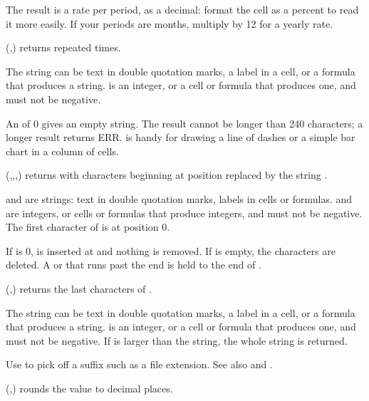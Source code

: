 The result is a rate per period, as a decimal: format the cell as a percent to read it more easily. If your periods are months, multiply by 12 for a yearly rate.

\Examples
{}

(,) returns  repeated  times.

The string can be text in double quotation marks, a label in a cell, or a formula that produces a string.  is an integer, or a cell or formula that produces one, and must not be negative.

An  of 0 gives an empty string. The result cannot be longer than 240 characters; a longer result returns ERR.  is handy for drawing a line of dashes or a simple bar chart in a column of cells.

\Examples
{}

(,,,) returns  with  characters beginning at position  replaced by the string .

 and  are strings: text in double quotation marks, labels in cells or formulas.  and  are integers, or cells or formulas that produce integers, and must not be negative. The first character of  is at position 0.

If  is 0,  is inserted at  and nothing is removed. If  is empty, the characters are deleted. A  or  that runs past the end is held to the end of .

\Examples
{}

(,) returns the last  characters of .

The string can be text in double quotation marks, a label in a cell, or a formula that produces a string.  is an integer, or a cell or formula that produces one, and must not be negative. If  is larger than the string, the whole string is returned.

Use  to pick off a suffix such as a file extension. See also  and .

\Examples
{}

(,) rounds the value  to  decimal places.

